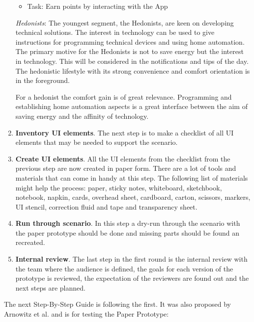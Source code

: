 \begin{enumerate}
	\begin{itemize}
		\item Task: Earn points by interacting with the App
	\end{itemize}
	
	\textit{Hedonists}:
	The youngest segment, the Hedonists, are keen on developing technical solutions. The interest in technology can be used to give instructions for programming technical devices and using home automation. The primary motive for the Hedonists is not to save energy but the interest in technology. This will be considered in the notifications and tips of the day. The hedonistic lifestyle with its strong convenience and comfort orientation is in the foreground.
	
	For a hedonist the comfort gain is of great relevance. Programming and establishing home automation aspects is a great interface between the aim of saving energy and the affinity of technology.
	
	
	\item \textbf{Inventory UI elements}. The next step is to make a checklist of all UI elements that may be needed to support the scenario.
	\item \textbf{Create UI elements}. All the UI elements from the checklist from the previous step are now created in paper form. There are a lot of tools and materials that can come in handy at this step. The following list of materials might help the process: paper, sticky notes,
	whiteboard, sketchbook, notebook, napkin, cards, overhead sheet, cardboard, carton, scissors, markers, UI stencil, correction fluid and tape and transparency sheet. 
	\item \textbf{Run through scenario}. In this step a dry-run through the scenario with the paper prototype should be done and missing parts should be found an recreated.
	\item \textbf{Internal review}. The last step in the first round is the internal review with the team where the audience is defined, the goals for each version of the prototype is reviewed, the expectation of the reviewers are found out and the next steps are planned.
\end{enumerate}

The next Step-By-Step Guide is following the first. It was also proposed by Arnowitz et al. \cite{arnowitz2010effective} and is for testing the Paper Prototype:


